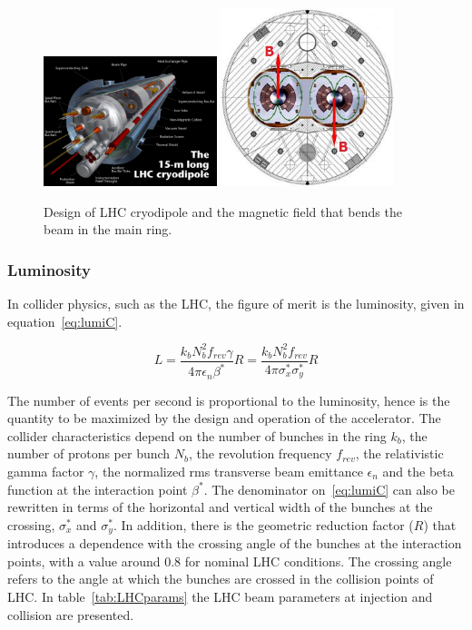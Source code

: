 \begin{figure}[!Hhtbp]
  \begin{center}
    \includegraphics[width=0.45\textwidth]{figs/cryodipole.jpg}
    \includegraphics[width=0.45\textwidth]{figs/dipole_B.jpg}
    \caption{Design of LHC cryodipole and the magnetic field that bends the beam in the main ring.}
    \label{fig:dipole}
  \end{center}
\end{figure}

\subsubsection{Luminosity}
\label{sec:lumi}

In collider physics, such as the LHC, the figure of merit is the luminosity, given in equation~\ref{eq:lumiC}. 

\begin{equation}
  \label{eq:lumiC}
  L=\frac{k_{b}N_{b}^{2}f_{rev}\gamma}{4\pi\epsilon_{n}\beta^{*}}R=\frac{k_{b}N_{b}^{2}f_{rev}}{4\pi\sigma^{*}_{x}\sigma^{*}_{y}}R
\end{equation}

The number of events per second is proportional to the luminosity, hence is the quantity to be maximized by the design and operation of the accelerator. The collider characteristics depend on the number of bunches in the ring $k_{b}$, the number of protons per bunch $N_{b}$, the revolution frequency $f_{rev}$, the relativistic gamma factor $\gamma$, the normalized rms transverse beam emittance $\epsilon_{n}$ and the beta function at the interaction point $\beta^{*}$. The denominator on~\ref{eq:lumiC} can also be rewritten in terms of the horizontal and vertical width of the bunches at the crossing, $\sigma^{*}_{x}$ and $\sigma^{*}_{y}$. In addition, there is the geometric reduction factor ($R$) that introduces a dependence with the crossing angle of the bunches at the interaction points, with a value around 0.8 for nominal LHC conditions. The crossing angle refers to the angle at which the bunches are crossed in the collision points of LHC. In table~\ref{tab:LHCparams} the LHC beam parameters at injection and collision are presented.  

